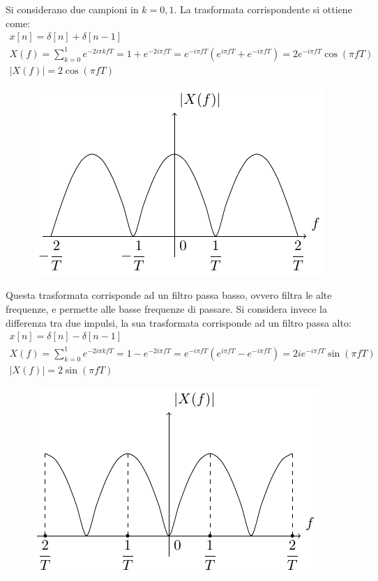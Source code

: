 \documentclass{article}
\numberwithin{equation}{subsection}
\begin{document}
Si considerano due campioni in $k=0,1$. La trasformata corrispondente si ottiene come:
\begin{gather*}
    x[n]=\delta[n]+\delta[n-1]\\
    X(f)=\displaystyle\sum_{k=0}^1e^{-2i\pi kfT}=1+e^{-2i\pi fT}=e^{-i\pi fT}\left(e^{i\pi fT}+e^{-i\pi fT}\right)=2e^{-i\pi fT}\cos(\pi fT)\\
    |X(f)|=2\cos(\pi fT)
\end{gather*}
\begin{figure}[H]%
    \centering
    \includegraphics{trasformata-discreta-2.pdf}%
\end{figure}


Questa trasformata corrisponde ad un filtro passa basso, ovvero filtra le alte frequenze, e permette alle basse frequenze di passare. Si considera invece la differenza 
tra due impulsi, la sua trasformata corrisponde ad un filtro passa alto:
\begin{gather*}
    x[n]=\delta[n]-\delta[n-1]\\
    X(f)=\displaystyle\sum_{k=0}^1e^{-2i\pi kfT}=1-e^{-2i\pi fT}=e^{-i\pi fT}\left(e^{i\pi fT}-e^{-i\pi fT}\right)=2ie^{-i\pi fT}\sin(\pi fT)\\
    |X(f)|=2\sin(\pi fT)
\end{gather*}
\begin{figure}[H]%
    \centering
    \includegraphics{trasformata-discreta-3.pdf}%
\end{figure}
\end{document}
